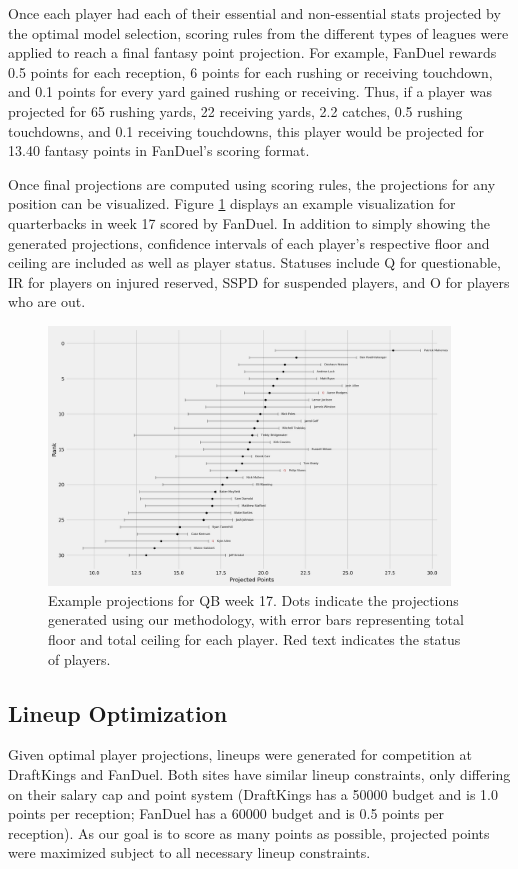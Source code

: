 \documentclass[12pt]{article}
\begin{document}
Once each player had each of their essential and non-essential stats projected by the optimal model selection, scoring rules from the different types of leagues were applied to reach a final fantasy point projection. For example, FanDuel rewards 0.5 points for each reception, 6 points for each rushing or receiving touchdown, and 0.1 points for every yard gained rushing or receiving. Thus, if a player was projected for 65 rushing yards, 22 receiving yards, 2.2 catches, 0.5 rushing touchdowns, and 0.1 receiving touchdowns, this player would be projected for 13.40 fantasy points in FanDuel's scoring format. \bigskip

Once final projections are computed using scoring rules, the projections for any position can be visualized. Figure \ref{qb17} displays an example visualization for quarterbacks in week 17 scored by FanDuel. In addition to simply showing the generated projections, confidence intervals of each player's respective floor and ceiling are included as well as player status. Statuses include Q for questionable, IR for players on injured reserved, SSPD for suspended players, and O for players who are out.

\begin{figure}[H]
  \centering
  \includegraphics[width=0.95\textwidth]{../figures/QB_17}
  \caption{Example projections for QB week 17. Dots indicate the projections generated using our methodology, with error bars representing total floor and total ceiling for each player. Red text indicates the status of players.}
  \label{qb17}
\end{figure}


\subsection{Lineup Optimization}
Given optimal player projections, lineups were generated for competition at DraftKings and FanDuel. Both sites have similar lineup constraints, only differing on their salary cap and point system (DraftKings has a  50000 budget and is 1.0 points per reception; FanDuel has a 60000 budget and is 0.5 points per reception). As our goal is to score as many points as possible, projected points were maximized subject to all necessary lineup constraints. \bigskip
\end{document}
